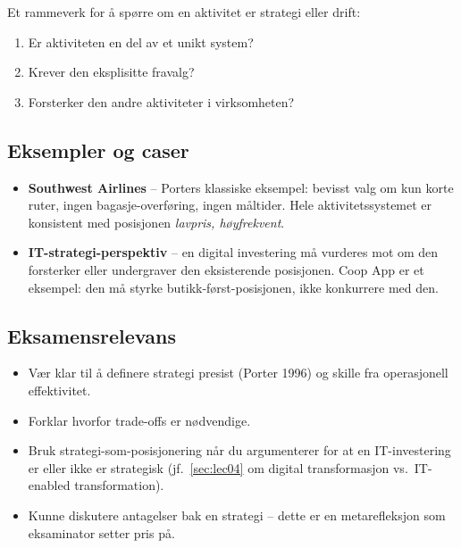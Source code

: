 Et rammeverk for å spørre om en aktivitet er strategi eller drift:
\begin{enumerate}
  \item Er aktiviteten en del av et unikt system?
  \item Krever den eksplisitte fravalg?
  \item Forsterker den andre aktiviteter i virksomheten?
\end{enumerate}

\subsection{Eksempler og caser}
\begin{itemize}
  \item \textbf{Southwest Airlines} -- Porters klassiske eksempel: bevisst valg
    om kun korte ruter, ingen bagasje-overføring, ingen måltider. Hele
    aktivitetssystemet er konsistent med posisjonen \emph{lavpris, høyfrekvent}.
  \item \textbf{IT-strategi-perspektiv} -- en digital investering må vurderes
    mot om den forsterker eller undergraver den eksisterende posisjonen.
    Coop App er et eksempel: den må styrke butikk-først-posisjonen, ikke
    konkurrere med den.
\end{itemize}

\subsection{Eksamensrelevans}
\begin{itemize}
  \item Vær klar til å definere strategi presist (Porter 1996) og skille fra
    operasjonell effektivitet.
  \item Forklar hvorfor trade-offs er nødvendige.
  \item Bruk strategi-som-posisjonering når du argumenterer for at en
    IT-investering er eller ikke er strategisk (jf.\ \autoref{sec:lec04} om
    digital transformasjon vs.\ IT-enabled transformation).
  \item Kunne diskutere antagelser bak en strategi -- dette er en
    metarefleksjon som eksaminator setter pris på.
\end{itemize}
